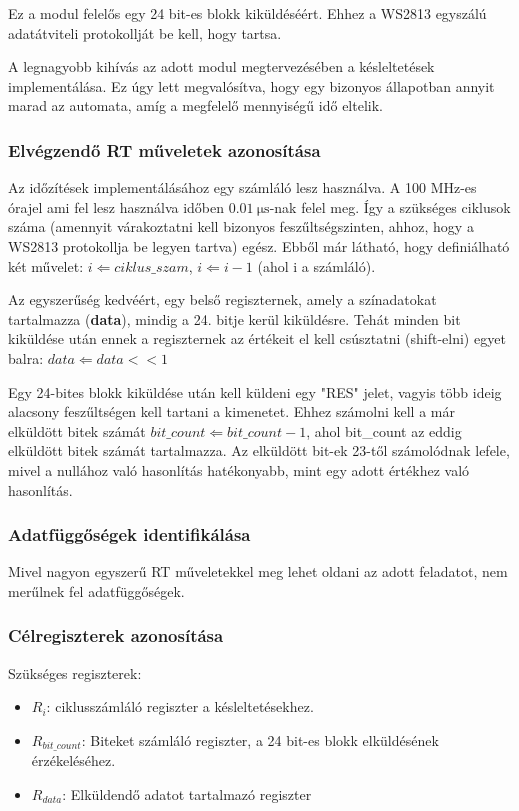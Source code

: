 \tab Ez a modul felelős egy 24 bit-es blokk kiküldéséért. Ehhez a WS2813 egyszálú adatátviteli protokollját be kell, hogy tartsa. 

\tab A legnagyobb kihívás az adott modul megtervezésében a késleltetések implementálása. Ez úgy lett megvalósítva, hogy egy bizonyos állapotban
annyit marad az automata, amíg a megfelelő mennyiségű idő eltelik.


\subsubsection{Elvégzendő RT műveletek azonosítása}

\tab Az időzítések implementálásához egy számláló lesz használva. A 100 MHz-es órajel ami fel lesz használva időben $\SI{0.01}{\micro\second}$-nak felel meg. 
Így a szükséges ciklusok száma (amennyit várakoztatni kell bizonyos feszűltségszinten, ahhoz, hogy a WS2813 protokollja be legyen tartva) egész.
Ebből már látható, hogy definiálható két művelet: $i \Leftarrow ciklus\_szam$, $i \Leftarrow i - 1$ (ahol i a számláló).

\tab Az egyszerűség kedvéért, egy belső regiszternek, amely a színadatokat tartalmazza (\textbf{data}), mindig a 24. bitje kerül kiküldésre.
Tehát minden bit kiküldése után ennek a regiszternek az értékeit el kell csúsztatni (shift-elni) egyet balra: $data \Leftarrow data << 1$

\tab Egy 24-bites blokk kiküldése után kell küldeni egy "RES" jelet, vagyis több ideig alacsony feszűltségen kell tartani a kimenetet. 
Ehhez számolni kell a már elküldött bitek számát $bit\_count \Leftarrow bit\_count - 1$, ahol bit\_count az eddig elküldött bitek számát tartalmazza.
Az elküldött bit-ek 23-től számolódnak lefele, mivel a nullához való hasonlítás hatékonyabb, mint egy adott értékhez való hasonlítás.


\subsubsection{Adatfüggőségek identifikálása}

\tab Mivel nagyon egyszerű RT műveletekkel meg lehet oldani az adott feladatot, nem merűlnek fel adatfüggőségek.


\subsubsection{Célregiszterek azonosítása}

Szükséges regiszterek:
\begin{itemize}
	\item $R_i$: ciklusszámláló regiszter a késleltetésekhez.
	\item $R_{bit\_count}$: Biteket számláló regiszter, a 24 bit-es blokk elküldésének érzékeléséhez.
	\item $R_{data}$: Elküldendő adatot tartalmazó regiszter
\end{itemize}


